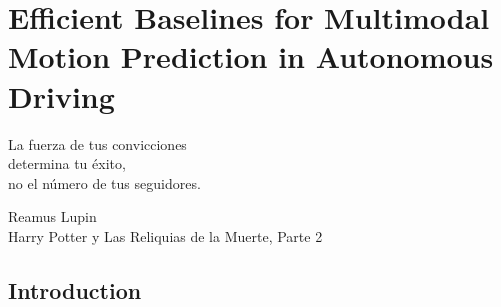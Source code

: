 % 
% 
% 
% 
% 
% 
% 

\chapter{Efficient Baselines for Multimodal Motion Prediction in Autonomous Driving}
\label{cha:efficient_baseline_for_mp_in_ad}

\begin{FraseCelebre}
	\begin{Frase}
		La fuerza de tus convicciones \\
		determina tu éxito, \\
		no el número de tus seguidores.
	\end{Frase}
	\begin{Fuente}
		Reamus Lupin \\
		Harry Potter y Las Reliquias de la Muerte, Parte 2
	\end{Fuente}
\end{FraseCelebre}

\section{Introduction}
\label{sec:6_introduction}

